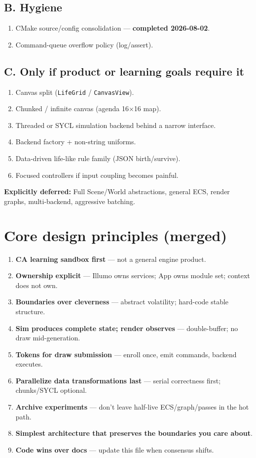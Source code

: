 \documentclass[10pt,a4paper]{article}
\begin{document}
\subsection{B. Hygiene}
\begin{enumerate}[resume]
    \item CMake source/config consolidation --- \textbf{completed 2026-08-02}.
    \item Command-queue overflow policy (log/assert).
\end{enumerate}

\subsection{C. Only if product or learning goals require it}
\begin{enumerate}[resume]
    \item Canvas split (\texttt{LifeGrid} / \texttt{CanvasView}).
    \item Chunked / infinite canvas (agenda 16$\times$16 map).
    \item Threaded or SYCL simulation backend behind a narrow interface.
    \item Backend factory + non-string uniforms.
    \item Data-driven life-like rule family (JSON birth/survive).
    \item Focused controllers if input coupling becomes painful.
\end{enumerate}

\noindent \textbf{Explicitly deferred:} Full Scene/World abstractions, general ECS, render graphs, multi-backend, aggressive batching.

\section{Core design principles (merged)}
\begin{enumerate}
    \item \textbf{CA learning sandbox first} --- not a general engine product.
    \item \textbf{Ownership explicit} --- Illumo owns services; App owns module set; context does not own.
    \item \textbf{Boundaries over cleverness} --- abstract volatility; hard-code stable structure.
    \item \textbf{Sim produces complete state; render observes} --- double-buffer; no draw mid-generation.
    \item \textbf{Tokens for draw submission} --- enroll once, emit commands, backend executes.
    \item \textbf{Parallelize data transformations last} --- serial correctness first; chunks/SYCL optional.
    \item \textbf{Archive experiments} --- don't leave half-live ECS/graph/passes in the hot path.
    \item \textbf{Simplest architecture that preserves the boundaries you care about}.
    \item \textbf{Code wins over docs} --- update this file when consensus shifts.
\end{enumerate}
\end{document}
